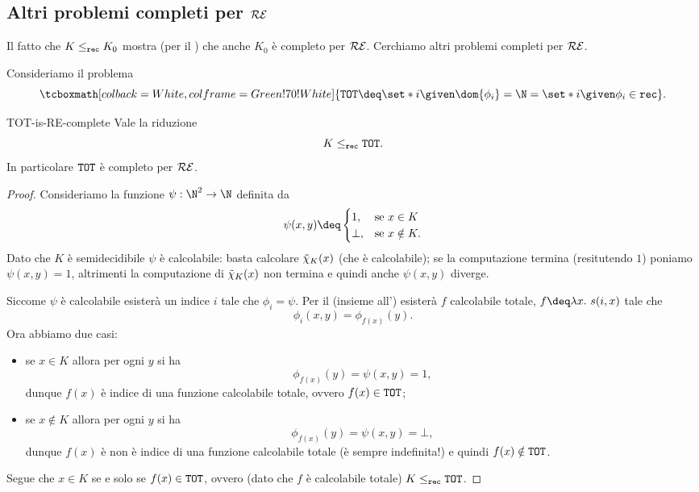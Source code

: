 \subsection{Altri problemi completi per $\mathcal{RE}$}

Il fatto che $K \leq_{\texttt{rec}} K_0$ mostra (per il ) che anche $K_0$ è completo per $\mathcal{RE}$. Cerchiamo altri problemi completi per $\mathcal{RE}$.


Consideriamo il problema \[
    \tcboxmath[colback=White, colframe=Green!70!White]{\TOT \deq \set*{i \given \dom{\phi_i} = \N} = \set*{i \given \phi_i \in \rec}}.
\]

\begin{proposition}{}{TOT-is-RE-complete}
    Vale la riduzione \[
        K \leq_{\texttt{rec}} \texttt{TOT}.
    \] In particolare $\texttt{TOT}$ è completo per $\mathcal{RE}$. 
\end{proposition}
\begin{proof}
    Consideriamo la funzione $\psi : \N^2 \to \N$ definita da \[
        \psi(x, y) \deq \begin{cases}
            1, &\text{se } x \in K \\
            \bot, &\text{se } x \notin K.
        \end{cases}
    \] Dato che $K$ è semidecidibile $\psi$ è calcolabile: basta calcolare $\tilde{\chi}_{K}(x)$ (che è calcolabile); se la computazione termina (resitutendo $1$) poniamo $\psi(x, y) = 1$, altrimenti la computazione di $\tilde{\chi}_{K}(x)$ non termina e quindi anche $\psi(x, y)$ diverge.

    Siccome $\psi$ è calcolabile esisterà un indice $i$ tale che $\phi_i = \psi$. Per il  (insieme all') esisterà $f$ calcolabile totale, $f \deq \lam{x}{s(i, x)}$ tale che \[
        \phi_i(x, y) = \phi_{f(x)}(y).
    \] Ora abbiamo due casi: \begin{itemize}
        \item se $x \in K$ allora per ogni $y$ si ha \[
            \phi_{f(x)}(y) = \psi(x, y) = 1,
        \] dunque $f(x)$ è indice di una funzione calcolabile totale, ovvero $f(x) \in \texttt{TOT}$;
        \item se $x \notin K$ allora per ogni $y$ si ha \[
            \phi_{f(x)}(y) = \psi(x, y) = \bot,
        \] dunque $f(x)$ è non è indice di una funzione calcolabile totale (è sempre indefinita!) e quindi $f(x) \notin \texttt{TOT}$.   
    \end{itemize}

    Segue che $x \in K$ se e solo se $f(x) \in \texttt{TOT}$, ovvero (dato che $f$ è calcolabile totale) $K \leq_{\texttt{rec}} \texttt{TOT}$.  
\end{proof}
